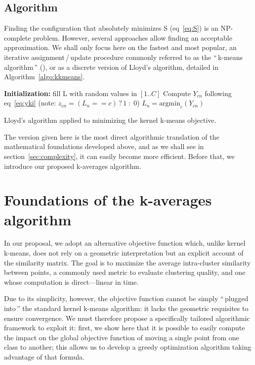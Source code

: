 \documentclass[10pt,journal,compsoc]{IEEEtran}
\newcommand{\cad}{---} %
\newcommand{\gl}[1]{``\,#1\,''} %
\begin{document}
\subsection{Algorithm}

Finding the configuration that absolutely minimizes S (eq~\ref{eq:S}) is an NP-complete problem. However, several approaches allow finding an acceptable approximation. We shall only focus here on the fastest and most popular, an iterative assignment\,/\,update procedure commonly referred to as the \gl{k-means algorithm} (\cite{macQueenBsmsp67}), or as a discrete version of Lloyd's algorithm, detailed in Algorithm~\ref{algo:kkmeans}.

\begin{algorithm}
	\label{algo:kkmeans}
	\SetAlgoLined
	\BlankLine	
	\textbf{Initialization:} fill L with random values in $[1..C]$\;
	\BlankLine	
	 {
		 {
			 {
				Compute $Y_{cn}$ following eq~\ref{eq:yki} \label{algline:kkmeans_cplx1}
				(note: $z_{cn} = (L_n == c)\,?\,1\;:\;0$)
			}
			$L_n = \textrm{argmin}_c (Y_{cn})$\;
		}
	}
	\BlankLine
	\caption{Lloyd's algorithm applied to minimizing the kernel k-means objective.}
\end{algorithm}

The version given here is the most direct algorithmic translation of the mathematical foundations developed above, and as we shall see in section~\ref{sec:complexity}, it can easily become more efficient. Before that, we introduce our proposed k-averages algorithm.


\section{Foundations of the k-averages algorithm} \label{sec:kaverages}

In our proposal, we adopt an alternative objective function which, unlike kernel k-means, does not rely on a geometric interpretation but an explicit account of the similarity matrix. The goal is to maximize the average intra-cluster similarity between points, a commonly used metric to evaluate clustering quality, and one whose computation is direct\cad{}linear in time.

Due to its simplicity, however, the objective function cannot be simply ``\,plugged into\,'' the standard kernel k-means algorithm: it lacks the geometric requisites to ensure convergence. We must therefore propose a specifically tailored algorithmic framework to exploit it: first, we show here that it is possible to easily compute the impact on the global objective function of moving a single point from one class to another; this allows us to develop a greedy optimization algorithm taking advantage of that formula.
\end{document}
